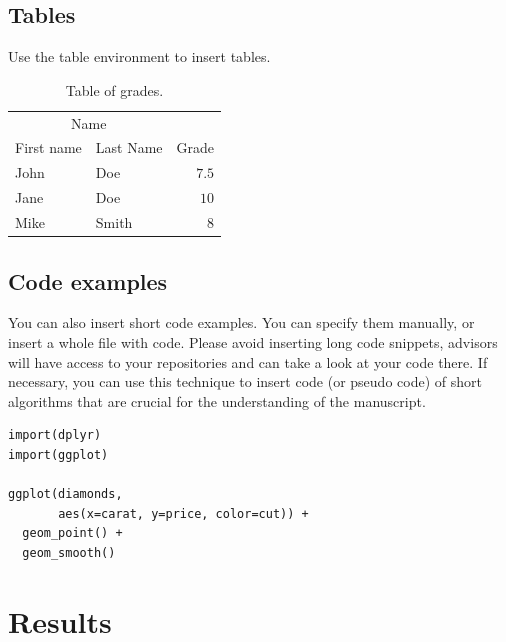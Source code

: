 \documentclass[fleqn,moreauthors,10pt]{ds_report}
\begin{document}
\subsection*{Tables}

Use the table environment to insert tables.

\begin{table}[hbt]
	\caption{Table of grades.}
	\centering
	\begin{tabular}{l l | r}
		\toprule
		\multicolumn{2}{c}{Name}       \\
		\cmidrule(r){1-2}
		First name & Last Name & Grade \\
		\midrule
		John       & Doe       & $7.5$ \\
		Jane       & Doe       & $10$  \\
		Mike       & Smith     & $8$   \\
		\bottomrule
	\end{tabular}
	\label{tab:label}
\end{table}


\subsection*{Code examples}

You can also insert short code examples. You can specify them manually, or insert a whole file with code. Please avoid inserting long code snippets, advisors will have access to your repositories and can take a look at your code there. If necessary, you can use this technique to insert code (or pseudo code) of short algorithms that are crucial for the understanding of the manuscript.

\lstset{language=Python}


\lstset{language=R}
\begin{lstlisting}
import(dplyr)
import(ggplot)

ggplot(diamonds,
	   aes(x=carat, y=price, color=cut)) +
  geom_point() +
  geom_smooth()
\end{lstlisting}


\section*{Results}
\end{document}
